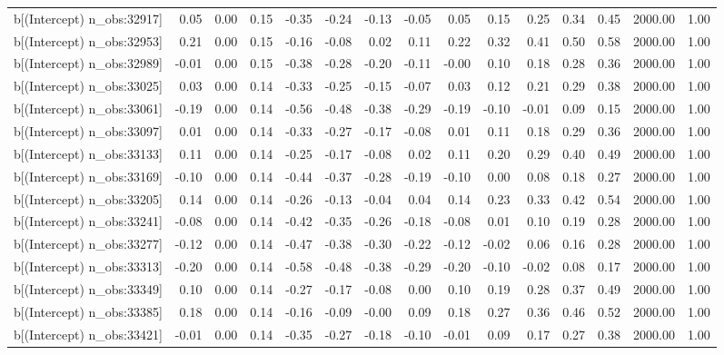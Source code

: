 \begin{table}[ht]
\begin{tabular}{rrrrrrrrrrrrrrr}
  b[(Intercept) n\_obs:32917] & 0.05 & 0.00 & 0.15 & -0.35 & -0.24 & -0.13 & -0.05 & 0.05 & 0.15 & 0.25 & 0.34 & 0.45 & 2000.00 & 1.00 \\ 
  b[(Intercept) n\_obs:32953] & 0.21 & 0.00 & 0.15 & -0.16 & -0.08 & 0.02 & 0.11 & 0.22 & 0.32 & 0.41 & 0.50 & 0.58 & 2000.00 & 1.00 \\ 
  b[(Intercept) n\_obs:32989] & -0.01 & 0.00 & 0.15 & -0.38 & -0.28 & -0.20 & -0.11 & -0.00 & 0.10 & 0.18 & 0.28 & 0.36 & 2000.00 & 1.00 \\ 
  b[(Intercept) n\_obs:33025] & 0.03 & 0.00 & 0.14 & -0.33 & -0.25 & -0.15 & -0.07 & 0.03 & 0.12 & 0.21 & 0.29 & 0.38 & 2000.00 & 1.00 \\ 
  b[(Intercept) n\_obs:33061] & -0.19 & 0.00 & 0.14 & -0.56 & -0.48 & -0.38 & -0.29 & -0.19 & -0.10 & -0.01 & 0.09 & 0.15 & 2000.00 & 1.00 \\ 
  b[(Intercept) n\_obs:33097] & 0.01 & 0.00 & 0.14 & -0.33 & -0.27 & -0.17 & -0.08 & 0.01 & 0.11 & 0.18 & 0.29 & 0.36 & 2000.00 & 1.00 \\ 
  b[(Intercept) n\_obs:33133] & 0.11 & 0.00 & 0.14 & -0.25 & -0.17 & -0.08 & 0.02 & 0.11 & 0.20 & 0.29 & 0.40 & 0.49 & 2000.00 & 1.00 \\ 
  b[(Intercept) n\_obs:33169] & -0.10 & 0.00 & 0.14 & -0.44 & -0.37 & -0.28 & -0.19 & -0.10 & 0.00 & 0.08 & 0.18 & 0.27 & 2000.00 & 1.00 \\ 
  b[(Intercept) n\_obs:33205] & 0.14 & 0.00 & 0.14 & -0.26 & -0.13 & -0.04 & 0.04 & 0.14 & 0.23 & 0.33 & 0.42 & 0.54 & 2000.00 & 1.00 \\ 
  b[(Intercept) n\_obs:33241] & -0.08 & 0.00 & 0.14 & -0.42 & -0.35 & -0.26 & -0.18 & -0.08 & 0.01 & 0.10 & 0.19 & 0.28 & 2000.00 & 1.00 \\ 
  b[(Intercept) n\_obs:33277] & -0.12 & 0.00 & 0.14 & -0.47 & -0.38 & -0.30 & -0.22 & -0.12 & -0.02 & 0.06 & 0.16 & 0.28 & 2000.00 & 1.00 \\ 
  b[(Intercept) n\_obs:33313] & -0.20 & 0.00 & 0.14 & -0.58 & -0.48 & -0.38 & -0.29 & -0.20 & -0.10 & -0.02 & 0.08 & 0.17 & 2000.00 & 1.00 \\ 
  b[(Intercept) n\_obs:33349] & 0.10 & 0.00 & 0.14 & -0.27 & -0.17 & -0.08 & 0.00 & 0.10 & 0.19 & 0.28 & 0.37 & 0.49 & 2000.00 & 1.00 \\ 
  b[(Intercept) n\_obs:33385] & 0.18 & 0.00 & 0.14 & -0.16 & -0.09 & -0.00 & 0.09 & 0.18 & 0.27 & 0.36 & 0.46 & 0.52 & 2000.00 & 1.00 \\ 
  b[(Intercept) n\_obs:33421] & -0.01 & 0.00 & 0.14 & -0.35 & -0.27 & -0.18 & -0.10 & -0.01 & 0.09 & 0.17 & 0.27 & 0.38 & 2000.00 & 1.00 \\ 

\end{tabular}
\end{table}
